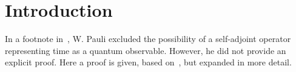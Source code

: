 \section{Introduction}

In a footnote in~\cite{PauliFootnote}, W. Pauli excluded the possibility
of a self-adjoint operator representing time as a quantum observable.
However, he did not provide an explicit proof.
Here a proof is given, based on~\cite{Galapon2002}, but expanded in more detail.